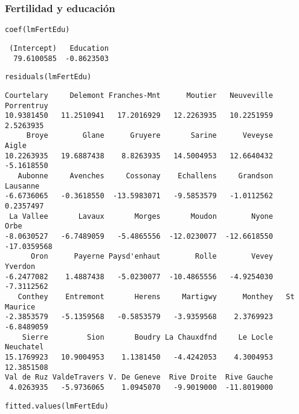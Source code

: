 \documentclass{beamer}
\begin{document}
\begin{frame}[fragile]
\frametitle{Fertilidad y educación}
\label{sec-3-2}


\lstset{language=R}
\begin{lstlisting}
coef(lmFertEdu)
\end{lstlisting}

\begin{verbatim}
 (Intercept)   Education 
  79.6100585  -0.8623503
\end{verbatim}


\lstset{language=R}
\begin{lstlisting}
residuals(lmFertEdu)
\end{lstlisting}


\begin{verbatim}
Courtelary     Delemont Franches-Mnt      Moutier   Neuveville   Porrentruy 
10.9381450   11.2510941   17.2016929   12.2263935   10.2251959    2.5263935 
     Broye        Glane      Gruyere       Sarine      Veveyse        Aigle 
10.2263935   19.6887438    8.8263935   14.5004953   12.6640432   -5.1618550 
   Aubonne     Avenches     Cossonay    Echallens     Grandson     Lausanne 
-6.6736065   -0.3618550  -13.5983071   -9.5853579   -1.0112562    0.2357497 
 La Vallee       Lavaux       Morges       Moudon        Nyone         Orbe 
-8.0630527   -6.7489059   -5.4865556  -12.0230077  -12.6618550  -17.0359568 
      Oron      Payerne Paysd'enhaut        Rolle        Vevey      Yverdon 
-6.2477082    1.4887438   -5.0230077  -10.4865556   -4.9254030   -7.3112562 
   Conthey    Entremont       Herens     Martigwy      Monthey   St Maurice 
-2.3853579   -5.1359568   -0.5853579   -3.9359568    2.3769923   -6.8489059 
    Sierre         Sion       Boudry La Chauxdfnd     Le Locle    Neuchatel 
15.1769923   10.9004953    1.1381450   -4.4242053    4.3004953   12.3851508 
Val de Ruz ValdeTravers V. De Geneve  Rive Droite  Rive Gauche 
 4.0263935   -5.9736065    1.0945070   -9.9019000  -11.8019000
\end{verbatim}


\lstset{language=R}
\begin{lstlisting}
fitted.values(lmFertEdu)
\end{lstlisting}



\end{frame}
\end{document}
